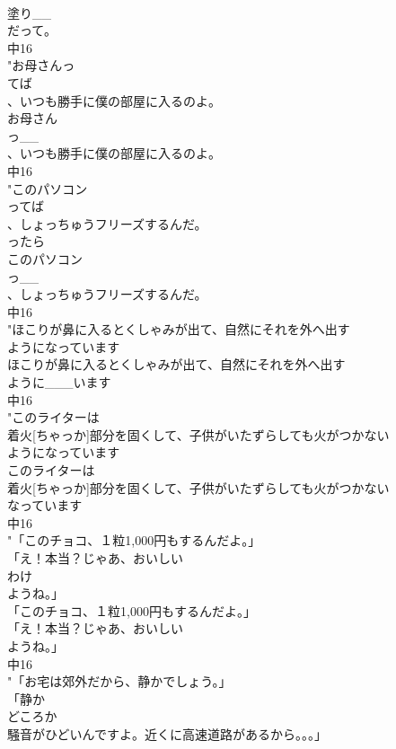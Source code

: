 \documentclass[8pt]{extreport}
\begin{document}
\begin{CJK}{UTF8}{min}
\\	塗り__
\\	だって。
\\	中16
\\	"お母さんっ
\\	てば
\\	、いつも勝手に僕の部屋に入るのよ。
\\	お母さん
\\	っ__
\\	、いつも勝手に僕の部屋に入るのよ。
\\	中16
\\	"このパソコン
\\	ってば
\\	、しょっちゅうフリーズするんだ。
\\	ったら
\\	このパソコン
\\	っ__
\\	、しょっちゅうフリーズするんだ。
\\	中16
\\	"ほこりが鼻に入るとくしゃみが出て、自然にそれを外へ出す
\\	ようになっています
\\	ほこりが鼻に入るとくしゃみが出て、自然にそれを外へ出す
\\	ように___います
\\	中16
\\	"このライターは
\\	着火[ちゃっか]部分を固くして、子供がいたずらしても火がつかない
\\	ようになっています
\\	このライターは
\\	着火[ちゃっか]部分を固くして、子供がいたずらしても火がつかない
\\	なっています
\\	中16
\\	"「このチョコ、１粒1,000円もするんだよ。」
\\	「え！本当？じゃあ、おいしい
\\	わけ
\\	ようね。」
\\	「このチョコ、１粒1,000円もするんだよ。」
\\	「え！本当？じゃあ、おいしい
\\	ようね。」
\\	中16
\\	"「お宅は郊外だから、静かでしょう。」
\\	「静か
\\	どころか
\\	騒音がひどいんですよ。近くに高速道路があるから。。。」

\end{CJK}
\end{document}
